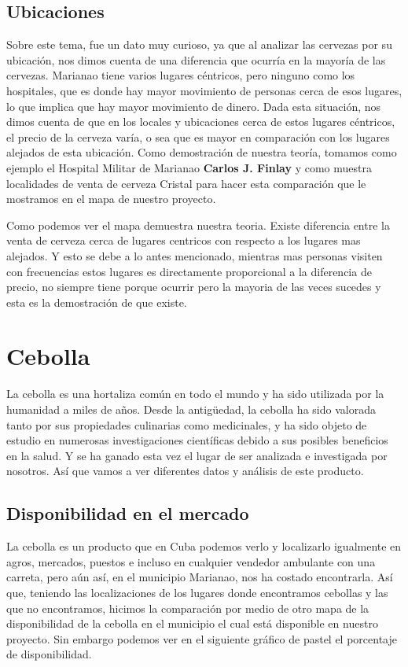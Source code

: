 \documentclass[a4paper,12pt]{article}
\begin{document}
\subsection{Ubicaciones}
Sobre este tema, fue un dato muy curioso, ya que al analizar las cervezas por su ubicación, nos dimos cuenta de una diferencia que ocurría en la mayoría de las cervezas. 
Marianao tiene varios lugares céntricos, pero ninguno como los hospitales, que es donde hay mayor movimiento de personas cerca de esos lugares, lo que implica que hay mayor movimiento de dinero. 
Dada esta situación, nos dimos cuenta de que en los locales y ubicaciones cerca de estos lugares céntricos, el precio de la cerveza varía, o sea que es mayor en comparación con los lugares alejados de esta ubicación. 
Como demostración de nuestra teoría, tomamos como ejemplo el Hospital Militar de Marianao \textbf{Carlos J. Finlay} y como muestra localidades de venta de cerveza Cristal para hacer esta comparación que le mostramos en el mapa de nuestro proyecto.

Como podemos ver el mapa demuestra nuestra teoria. Existe diferencia entre la venta de cerveza cerca de lugares centricos con respecto a los lugares mas alejados. 
Y esto se debe a lo antes mencionado, mientras mas personas visiten con frecuencias estos lugares es directamente proporcional a la diferencia de precio, no siempre tiene porque ocurrir pero la mayoria de las veces sucedes y esta es la demostración de que existe.
\section{Cebolla}
La cebolla es una hortaliza común en todo el mundo y ha sido utilizada por la humanidad a miles de años. 
Desde la antigüedad, la cebolla ha sido valorada tanto por sus propiedades culinarias como medicinales, y ha sido objeto de estudio en numerosas investigaciones científicas debido a sus posibles beneficios en la salud. 
Y se ha ganado esta vez el lugar de ser analizada e investigada por nosotros. Así que vamos a ver diferentes datos y análisis de este producto.

\subsection{Disponibilidad en el mercado}
La cebolla es un producto que en Cuba podemos verlo y localizarlo igualmente en agros, mercados, puestos e incluso en cualquier vendedor ambulante con una carreta, pero aún así, en el municipio Marianao, nos ha costado encontrarla. 
Así que, teniendo las localizaciones de los lugares donde encontramos cebollas y las que no encontramos, hicimos la comparación por medio de otro mapa de la disponibilidad de la cebolla en el municipio el cual está disponible en nuestro proyecto. 
Sin embargo podemos ver en el siguiente gráfico de pastel el porcentaje de disponibilidad. 
\end{document}
